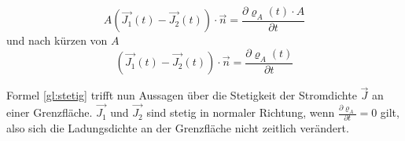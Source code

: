 \begin{equation*}
A(\vec{J_1}(t)-\vec{J_2}(t))\cdot \vec{n} = \frac{\partial \varrho_A(t) \cdot A}{\partial t}
\end{equation*}
und nach kürzen von $A$
\begin{equation}
\label{gl:stetig}
(\vec{J_1}(t)-\vec{J_2}(t))\cdot \vec{n} = \frac{\partial \varrho_A(t)}{\partial t}
\end{equation}

Formel \ref{gl:stetig} trifft nun Aussagen über die Stetigkeit der Stromdichte $\vec{J}$ an einer Grenzfläche. $\vec{J_1}$ und $\vec{J_2}$ sind stetig in normaler Richtung, wenn $\frac{\partial \varrho_A}{\partial t} = 0$ gilt, also sich die Ladungsdichte an der Grenzfläche nicht zeitlich verändert.